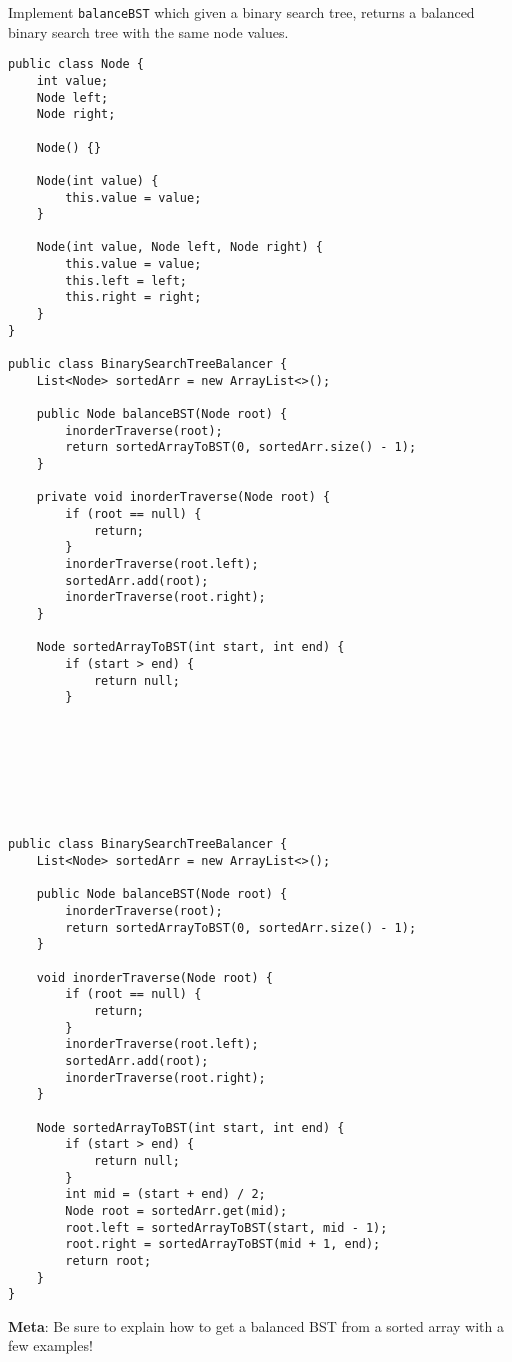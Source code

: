 \begin{blocksection}
\question Implement \lstinline$balanceBST$ which given a binary search tree, 
returns a balanced binary search tree with the same node values.

\ifprintanswers
\else
\begin{lstlisting}
public class Node {
    int value;
    Node left;
    Node right;
    
    Node() {}
    
    Node(int value) {
        this.value = value;
    }
    
    Node(int value, Node left, Node right) {
        this.value = value;
        this.left = left;
        this.right = right;
    }
}

public class BinarySearchTreeBalancer {
    List<Node> sortedArr = new ArrayList<>();

    public Node balanceBST(Node root) {
        inorderTraverse(root);
        return sortedArrayToBST(0, sortedArr.size() - 1);
    }

    private void inorderTraverse(Node root) {
        if (root == null) {
            return;
        }
        inorderTraverse(root.left);
        sortedArr.add(root);
        inorderTraverse(root.right);
    }

    Node sortedArrayToBST(int start, int end) {
        if (start > end) {
            return null;
        }








\end{lstlisting}
\fi

\begin{solution}
\begin{lstlisting}
public class BinarySearchTreeBalancer {
    List<Node> sortedArr = new ArrayList<>();

    public Node balanceBST(Node root) {
        inorderTraverse(root);
        return sortedArrayToBST(0, sortedArr.size() - 1);
    }

    void inorderTraverse(Node root) {
        if (root == null) {
            return;
        }
        inorderTraverse(root.left);
        sortedArr.add(root);
        inorderTraverse(root.right);
    }

    Node sortedArrayToBST(int start, int end) {
        if (start > end) {
            return null;
        }
        int mid = (start + end) / 2;
        Node root = sortedArr.get(mid);
        root.left = sortedArrayToBST(start, mid - 1);
        root.right = sortedArrayToBST(mid + 1, end);
        return root;
    }
}
\end{lstlisting}

\textbf{Meta}: Be sure to explain how to get a balanced BST from a sorted array with a few examples!

\end{solution}
\end{blocksection}

